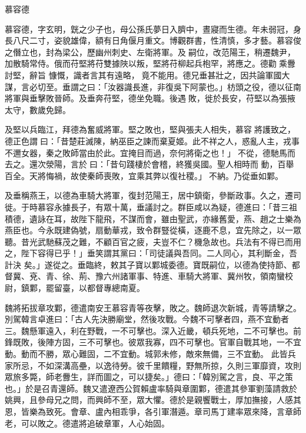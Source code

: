 
\begin{pinyinscope}

 慕容德



 慕容德，字玄明，皝之少子也，母公孫氏夢日入臍中，晝寢而生德。年未弱冠，身長八尺二寸，姿貌雄偉，額有日角偃月重文。博觀群書，性清慎，多才藝。慕容俊之僭立也，封為梁公，歷幽州刺史、左衛將軍。及嗣位，改范陽王，稍遷魏尹，加散騎常侍。俄而苻堅將苻雙據陜以叛，堅將苻柳起兵枹罕，將應之。德勸乘釁討堅，辭旨
 慷慨，識者言其有遠略，竟不能用。德兄垂甚壯之，因共論軍國大謀，言必切至。垂謂之曰：「汝器識長進，非復吳下阿蒙也。」枋頭之役，德以征南將軍與垂擊敗晉師。及垂奔苻堅，德坐免職。後遇敗，徙於長安，苻堅以為張掖太守，數歲免歸。



 及堅以兵臨江，拜德為奮威將軍。堅之敗也，堅與張夫人相失，慕容將護致之，德正色謂曰：「昔楚莊滅陳，納巫臣之諫而棄夏姬。此不祥之人，惑亂人主，戎事不邇女器，秦之敗師當由於此。宜掩目而過，奈何將衛之也！」不從，德馳馬而去之。還次滎陽，言於曰：「昔句踐棲於會稽，終獲吳國。聖人相時而
 動，百舉百全。天將悔禍，故使秦師喪敗，宜乘其弊以復社稷。」不納。乃從垂如鄴。



 及垂稱燕王，以德為車騎大將軍，復封范陽王，居中鎮衛，參斷政事。久之，遷司徙。于時慕容永據長子，有眾十萬，垂議討之。群臣咸以為疑，德進曰：「昔三祖積德，遺詠在耳，故陛下龍飛，不謀而會，雖由聖武，亦緣舊愛，燕、趙之士樂為燕臣也。今永既建偽號，扇動華戎，致令群豎從橫，逐鹿不息，宜先除之，以一眾聽。昔光武馳蘇茂之難，不顧百官之疲，夫豈不仁？機急故也。兵法有不得已而用之，陛下容得已乎！」垂笑謂其黨曰：「司徒議與吾同。二人同心，其利斷金，吾計決
 矣。」遂從之。垂臨終，敕其子寶以鄴城委德。寶既嗣位，以德為使持節、都督冀、兗、青、徐、荊、豫六州諸軍事、特進、車騎大將軍、冀州牧，領南蠻校尉，鎮鄴，罷留臺，以都督專總南夏。



 魏將拓拔章攻鄴，德遣南安王慕容青等夜擊，敗之。魏師退次新城，青等請擊之。別駕韓言卓進曰：「古人先決勝廟堂，然後攻戰。今魏不可擊者四，燕不宜動者三。魏懸軍遠入，利在野戰，一不可擊也。深入近畿，頓兵死地，二不可擊也。前鋒既敗，後陣方固，三不可擊也。彼眾我寡，四不可擊也。官軍自戰其地，一不宜動。動而不勝，眾心難固，二不宜動。城郭未修，敵來無備，三不宜動。
 此皆兵家所忌，不如深溝高壘，以逸待勞。彼千里饋糧，野無所掠，久則三軍靡資，攻則眾旅多斃，師老釁生，詳而圖之，可以捷矣。」德曰：「韓別駕之言，良、平之策也。」於是召青還師。魏又遣遼西公賀賴盧率騎與章圍鄴，德遣其參軍劉藻請救於姚興，且參母兄之問，而興師不至，眾大懼。德於是親饗戰士，厚加撫接，人感其恩，皆樂為致死。會章、盧內相乖爭，各引軍潛遁。章司馬丁建率眾來降，言章師老，可以敗之。德遣將追破章軍，人心始固。




\end{pinyinscope}
